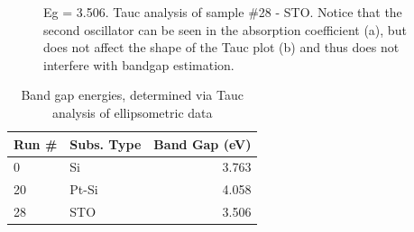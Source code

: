 \begin{figure}[htbp]
   \centering
   \hspace{0.5cm}
   \caption[Results of Tauc Analysis on Sample \#28 on STO]%
   		{Eg = 3.506. Tauc analysis of sample \#28 - STO. Notice that the second oscillator can be seen in the absorption coefficient (a), but does not affect the shape of the Tauc plot (b) and thus does not interfere with bandgap estimation.}\label{fig:Tauc-28-STO}
\end{figure}

\begin{table}
	\centering
	\caption[Calculated Band Gap Energies]{Band gap energies, determined via Tauc analysis of ellipsometric data}%
	\label{tbl:bandgaps}
	\begin{tabular}{l l r}
		\toprule
		Run \#	&Subs. Type	&Band Gap (eV)\\ \midrule
		0		&Si			&3.763\\
		20		&Pt-Si		&4.058\\
		28		&STO		&3.506\\
		\bottomrule
	\end{tabular}
\end{table}

